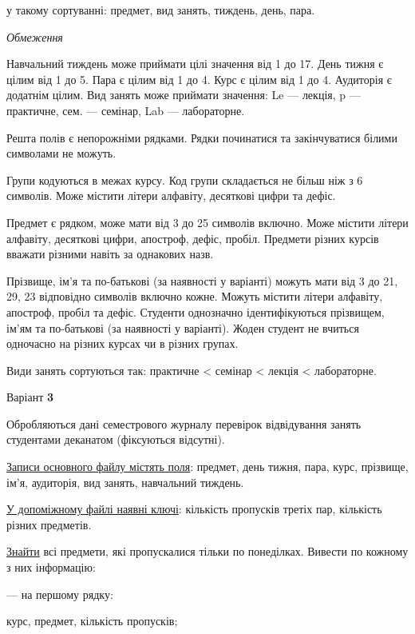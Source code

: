 \documentclass[11pt, ukrainian]{article}
\begin{document}
{\noindent}у такому сортуванні: предмет, вид занять, тиждень, день, пара.


\bigskip\textit{Обмеження}

Навчальний тиждень може приймати цілі значення від 1 до 17.
День тижня є цілим від 1 до 5. Пара є цілим від 1 до 4.
Курс є цілим від 1 до 4. Аудиторія є додатнім цілим.
Вид занять може приймати значення:
Le --- лекція, p --- практичне, сем. --- семінар, Lab --- лабораторне.

Решта полів є непорожніми рядками.
Рядки починатися та закінчуватися білими символами не можуть.

Групи кодуються в межах курсу.
Код групи складається не більш ніж з 6 символів.
Може містити літери алфавіту, десяткові цифри та дефіс.

Предмет є рядком, може мати від 3 до 25 символів включно.
Може містити літери алфавіту, десяткові цифри, апостроф, дефіс, пробіл.
Предмети різних курсів вважати різними навіть за однакових назв.

Прізвище, ім’я та по-батькові (за наявності у варіанті)
можуть мати від 3 до 21, 29, 23 відповідно символів включно кожне.
Можуть містити літери алфавіту, апостроф, пробіл та дефіс.
Студенти однозначно ідентифікуються прізвищем, ім’ям та по-батькові (за наявності у варіанті).
Жоден студент не вчиться одночасно на різних курсах чи в різних групах.

Види занять сортуються так: практичне < семінар < лекція < лабораторне.



\par
\newpage
{\center Варіант  \No \textbf { 3 }\par}
\bigskip
Обробляються дані семестрового журналу перевірок відвідування занять студентами деканатом (фіксуються відсутні). 

\underline{Записи основного файлу містять поля}: предмет, день тижня, пара, курс, прізвище, ім’я, аудиторія, вид занять, навчальний тиждень.

\underline{У допоміжному файлі наявні ключі}: кількість пропусків третіх пар, кількість різних предметів.

\underline{Знайти} всі предмети, які пропускалися тільки по понеділках. Вивести по кожному з них інформацію:\par
{\noindent}--- на першому рядку:\par
курс, предмет, кількість пропусків;
\end{document}
